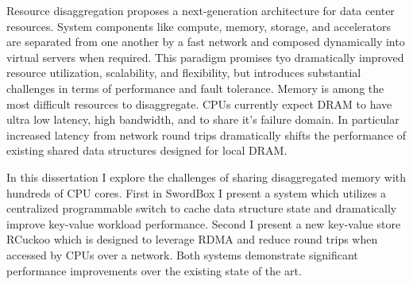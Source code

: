 \documentclass[12pt]{ucsddissertation}
\newcommand{\sword}{SwordBox}
\begin{document}
\begin{dissertationabstract} 
Resource disaggregation proposes a next-generation architecture for data center resources. System
components like compute, memory, storage, and accelerators are separated from one another by a fast
network and composed dynamically into virtual servers when required. This paradigm promises tyo
dramatically improved resource utilization, scalability, and flexibility, but introduces substantial
challenges in terms of performance and fault tolerance. Memory is among the most difficult resources
to disaggregate. CPUs currently expect DRAM to have ultra low latency, high bandwidth, and to share it's
failure domain. In particular increased latency from network round trips dramatically shifts the
performance of existing shared data structures designed for local DRAM.

In this dissertation I explore the challenges of sharing disaggregated memory with hundreds of CPU cores.
First in {\sword} I present a system which utilizes a centralized programmable switch to cache data
structure state and dramatically improve key-value workload performance. Second I present a new
key-value store RCuckoo which is designed to leverage RDMA and reduce round trips when accessed by
CPUs over a network. Both systems demonstrate significant performance improvements over the
existing state of the art.

\end{dissertationabstract}

\mainmatter
\end{document}
